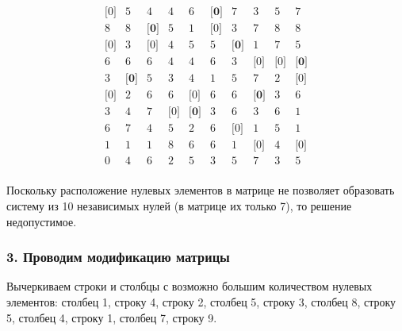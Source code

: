 \documentclass[17pt]{extarticle}
\begin{document}
\[
    \begin{array}{*{10}{c}}
        \text{[0]} & 5            & 4            & 4          & 6            & \textbf{[0]} & 7            & 3            & 5          & 7            \\
        8          & 8            & \textbf{[0]} & 5          & 1            & \text{[0]}   & 3            & 7            & 8          & 8            \\
        \text{[0]} & 3            & \text{[0]}   & 4          & 5            & 5            & \textbf{[0]} & 1            & 7          & 5            \\
        6          & 6            & 6            & 4          & 4            & 6            & 3            & \text{[0]}   & \text{[0]} & \textbf{[0]} \\
        3          & \textbf{[0]} & 5            & 3          & 4            & 1            & 5            & 7            & 2          & \text{[0]}   \\
        \text{[0]} & 2            & 6            & 6          & \text{[0]}   & 6            & 6            & \textbf{[0]} & 3          & 6            \\
        3          & 4            & 7            & \text{[0]} & \textbf{[0]} & 3            & 6            & 3            & 6          & 1            \\
        6          & 7            & 4            & 5          & 2            & 6            & \text{[0]}   & 1            & 5          & 1            \\
        1          & 1            & 1            & 8          & 6            & 6            & 1            & \text{[0]}   & 4          & \text{[0]}   \\
        0          & 4            & 6            & 2          & 5            & 3            & 5            & 7            & 3          & 5            \\
    \end{array}
\]

Поскольку расположение нулевых элементов в матрице не позволяет образовать систему из 10 независимых нулей (в матрице их только 7), то решение недопустимое.

\subsubsection*{3. Проводим модификацию матрицы}

Вычеркиваем строки и столбцы с возможно большим количеством нулевых элементов: столбец 1, строку 4, строку 2, столбец 5, строку 3, столбец 8, строку 5, столбец 4, строку 1, столбец 7, строку 9.
\end{document}
